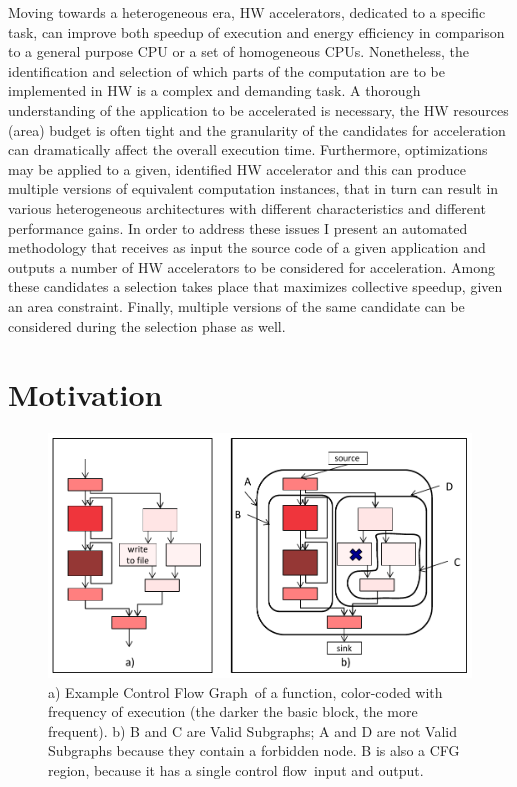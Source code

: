\documentclass[]{usiinfthesis}
\newcommand{\controlflow}{control flow}
\newcommand{\CFG}{Control Flow Graph}
\begin{document}
Moving towards a heterogeneous era, HW accelerators, dedicated to a specific task, can
improve both speedup of execution and energy efficiency in comparison to a general 
purpose CPU or a set of homogeneous CPUs. Nonetheless, the identification and selection 
of which parts of the computation are to be implemented in HW is a complex and demanding task. 
A thorough understanding of the application to be accelerated is necessary, the HW resources
(area) budget is often tight and the granularity of the candidates for acceleration 
can dramatically affect the overall execution time. Furthermore, optimizations may be applied
to a given, identified HW accelerator and this can produce multiple versions of equivalent
computation instances, that in turn can result in various heterogeneous architectures with different
characteristics and different performance gains.
In order to address these issues I present an automated methodology
that receives as input the source code of a given application and outputs a number of 
HW accelerators to be considered for acceleration. Among these candidates a selection takes 
place that maximizes collective speedup, given an area constraint. Finally, 
multiple versions of the same candidate can be considered during the selection phase as well.

\section{Motivation}
\label{sec:mot}


\begin{figure}[t]
\centering
\includegraphics[width= .7 \linewidth]{Figs/cfg_example}
\caption{a) Example \CFG\ of a function, color-coded with frequency
  of execution (the darker the basic block, the more frequent). b) B
  and C are Valid Subgraphs; A and D are not Valid Subgraphs because
  they contain a forbidden node. B is also a CFG region, because it has a
  single \controlflow\ input and output.}
\label{fig:cfg-example}
\end{figure}
\end{document}
